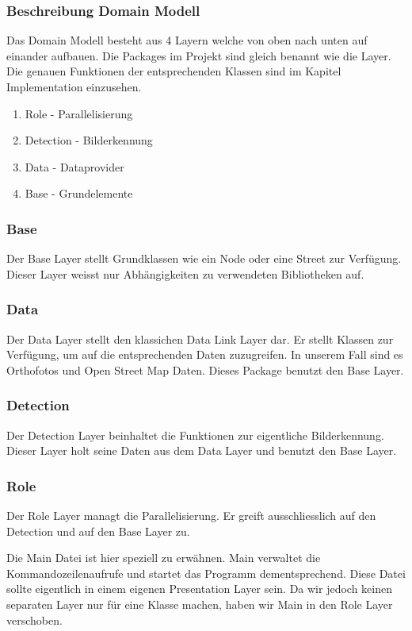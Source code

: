 \subsubsection{Beschreibung Domain Modell}
Das Domain Modell besteht aus 4 Layern welche von oben nach unten auf einander aufbauen. Die Packages im Projekt sind gleich benannt wie die Layer. Die genauen Funktionen der entsprechenden Klassen sind im Kapitel Implementation einzusehen.
\begin{enumerate}
	\item Role - Parallelisierung
	\item Detection - Bilderkennung
	\item Data - Dataprovider
	\item Base - Grundelemente
\end{enumerate}

\subsubsection{Base}
Der Base Layer stellt Grundklassen wie ein Node oder eine Street zur Verfügung. Dieser Layer weisst nur Abhängigkeiten zu verwendeten Bibliotheken auf.

\subsubsection{Data}
Der Data Layer stellt den klassichen Data Link Layer dar. Er stellt Klassen zur Verfügung, um auf die entsprechenden Daten zuzugreifen. In unserem Fall sind es Orthofotos und Open Street Map Daten. Dieses Package benutzt den Base Layer.

\subsubsection{Detection}
Der Detection Layer beinhaltet die Funktionen zur eigentliche Bilderkennung. Dieser Layer holt seine Daten aus dem Data Layer und benutzt den Base Layer.

\subsubsection{Role}
Der Role Layer managt die Parallelisierung. Er greift ausschliesslich auf den Detection und auf den Base Layer zu.

Die Main Datei ist hier speziell zu erwähnen. Main verwaltet die Kommandozeilenaufrufe und startet das Programm dementsprechend. Diese Datei sollte eigentlich in einem eigenen Presentation Layer sein. Da wir jedoch keinen separaten Layer nur für eine Klasse machen, haben wir Main in den Role Layer verschoben.
